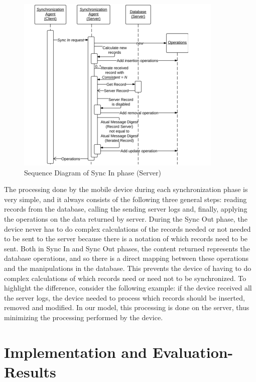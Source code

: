 \documentclass[conference]{IEEEtran}
\begin{document}
\begin{figure}[h]
	\centering
	\includegraphics[trim={1cm 0.3cm 1.2cm 0.2cm},clip, width=1.1\linewidth]{ser.png} 
	\caption{Sequence Diagram of Sync In phase (Server)}
	\label{ser1}
\end{figure}

The processing done by the mobile device during each synchronization phase is very simple, and it always consists of the following three general steps: reading records from the
database, calling the sending server logs and, finally, applying the operations on the data returned by server. During the Sync Out phase, the device never has to do complex calculations of the records needed or not needed to be sent to the server because there is a notation of which records need to be sent. Both in Sync In and Sync Out phases, the content returned
represents the database operations, and so there is a direct mapping between these operations and the manipulations in the database. This prevents the device of having to do complex
calculations of which records need or need not to be synchronized. To highlight the difference, consider the following example: if the device received all the server logs, the device needed to process which records should be inserted, removed and modified. In our model, this processing is done on the server, thus minimizing the processing performed by the device. 

\section{Implementation and Evaluation-Results}
\end{document}
